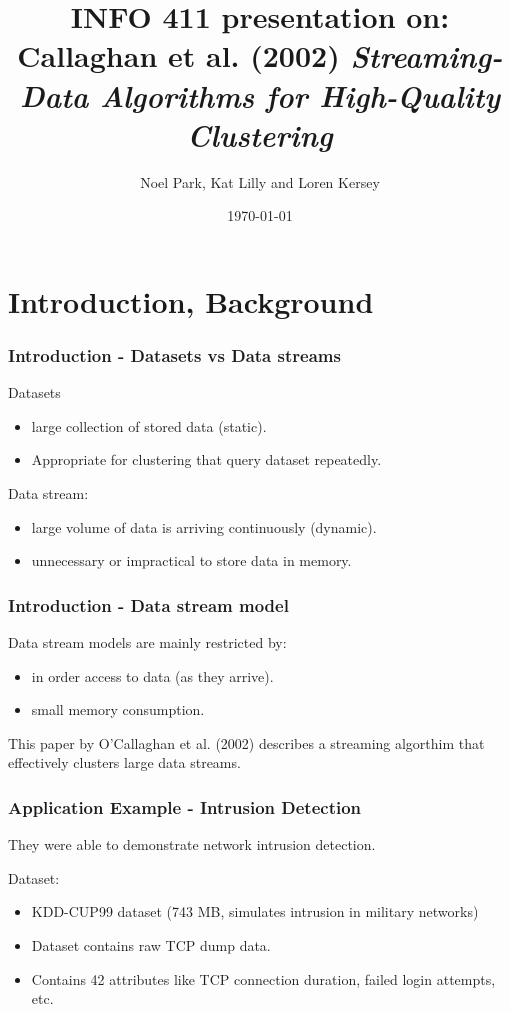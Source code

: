 \documentclass{beamer}
\title{{\small INFO 411 presentation on:} \\ \bigskip Callaghan et
  al. (2002) {\em Streaming-Data Algorithms for High-Quality
    Clustering}} \author{Noel Park, Kat Lilly and Loren Kersey}
\date{\today}
\begin{document}
\frame{\titlepage}

\section[Outline]{}
\frame{\tableofcontents}

\section{Introduction, Background}

\frame
{
  \frametitle{Introduction - Datasets vs Data streams}

  Datasets
  \begin{itemize}
    \item large collection of stored data (static).
    \item Appropriate for clustering that query dataset repeatedly.
    \newline
  \end{itemize}

  Data stream:
  \begin{itemize}
    \item large volume of data is arriving continuously (dynamic).
    \item unnecessary or impractical to store data in memory.
  \end{itemize}
}

\frame
{
  \frametitle{Introduction - Data stream model}

  Data stream models are mainly restricted by:
  \begin{itemize}
    \item in order access to data (as they arrive).
    \item small memory consumption.
    \newline
  \end{itemize}

  This paper by O'Callaghan et al. (2002) describes a streaming
  algorthim that effectively clusters large data streams.

}

\frame
{
  \frametitle{Application Example - Intrusion Detection}
  
  They were able to demonstrate network intrusion detection. \newline

  Dataset:
  \begin{itemize}
    \item KDD-CUP99 dataset (743 MB, simulates intrusion in military networks)
    \item Dataset contains raw TCP dump data.
    \item Contains 42 attributes like TCP connection duration, failed login attempts, etc.
    \newline
  \end{itemize}
}
\end{document}
